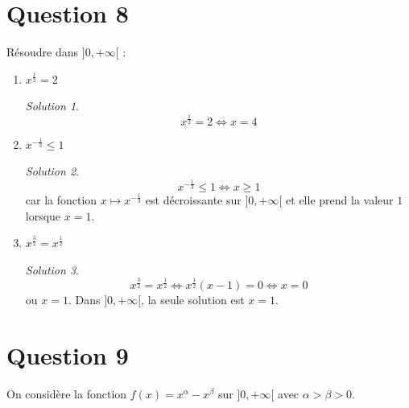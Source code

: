 \documentclass[
  12pt,
  letterpaper,
]{book}
\theoremstyle{remark}
\newtheorem*{solution}{Solution}
\begin{document}
\hypertarget{question-8-1}{%
\section{Question 8}\label{question-8-1}}

Résoudre dans \(]0,+\infty[\) :

\begin{enumerate}
\item
  \(x^{\frac{1}{2}} = 2\)

  \begin{solution}

  \[x^{\frac{1}{2}} = 2 \iff x = 4\]

  \end{solution}
\item
  \(x^{-\frac{1}{3}} \leq 1\)

  \begin{solution}

  \[x^{-\frac{1}{3}} \leq 1 \iff x \geq 1\] car la fonction
  \(x \mapsto x^{-\frac{1}{3}}\) est décroissante sur \(]0,+\infty[\) et
  elle prend la valeur \(1\) lorsque \(x=1\).

  \end{solution}
\item
  \(x^{\frac{3}{2}} = x^{\frac{1}{2}}\)

  \begin{solution}

  \[x^{\frac{3}{2}} = x^{\frac{1}{2}} \iff x^{\frac{1}{2}}(x-1) = 0 \iff x = 0\]
  ou \(x = 1\). Dans \(]0,+\infty[\), la seule solution est \(x = 1\).

  \end{solution}
\end{enumerate}

\hypertarget{question-9-1}{%
\section{Question 9}\label{question-9-1}}

On considère la fonction \(f(x) = x^{\alpha} - x^{\beta}\) sur
\(]0,+\infty[\) avec \(\alpha > \beta > 0\).
\end{document}
